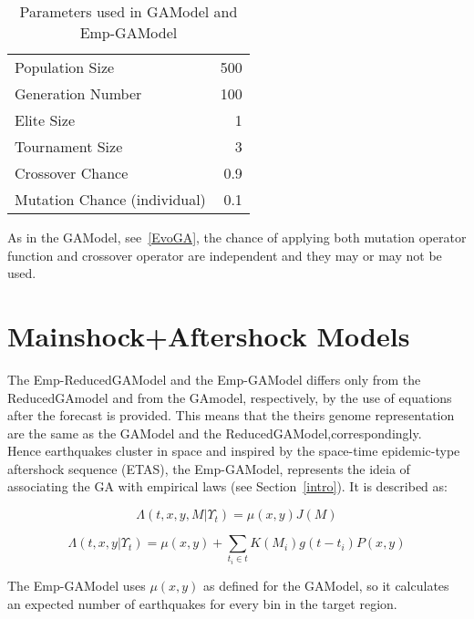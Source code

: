 \begin{table}[!ht]
  \caption{Parameters used in GAModel and Emp-GAModel}
  \label{GAHParameters}
  \begin{center}
  \begin{tabular}{|l|r|}
    \hline
    Population Size & 500\\
    Generation Number & 100\\
    Elite Size & 1\\
    Tournament Size & 3\\
    Crossover Chance & 0.9\\
    Mutation Chance (individual) & 0.1\\
    \hline    
  \end{tabular}
  \end{center}
\end{table}

As in the GAModel, see~\ref{EvoGA}, the chance of applying both mutation operator function and crossover operator are independent and they may or may not be used.\\

\section{Mainshock+Aftershock Models}\label{m+a+e}

The Emp-ReducedGAModel and the Emp-GAModel differs only from the ReducedGAmodel and from the GAmodel, respectively, by the use of equations after the forecast is provided. This means that the theirs genome representation are the same as the GAModel and the ReducedGAModel,correspondingly.\\

Hence earthquakes cluster in space and inspired by the space-time
epidemic-type aftershock sequence (ETAS), the Emp-GAModel, represents
the ideia of associating the GA with empirical laws (see
Section~\ref{intro}). It is described as:

\begin{equation}\label{reducedgamodel}
	\Lambda(t,x,y,M|\Upsilon_t) = \mu(x,y)J(M)
\end{equation}


\begin{equation}\label{emp-model}
 \Lambda(t,x,y|\Upsilon_t) = \mu(x,y) + \displaystyle\sum_{t_i \in t} K(M_i)g(t-t_i)P(x,y)
\end{equation}

The Emp-GAModel uses $\mu(x,y)$ as defined for the GAModel, so it calculates an expected number of earthquakes for every bin in the target region.\\

